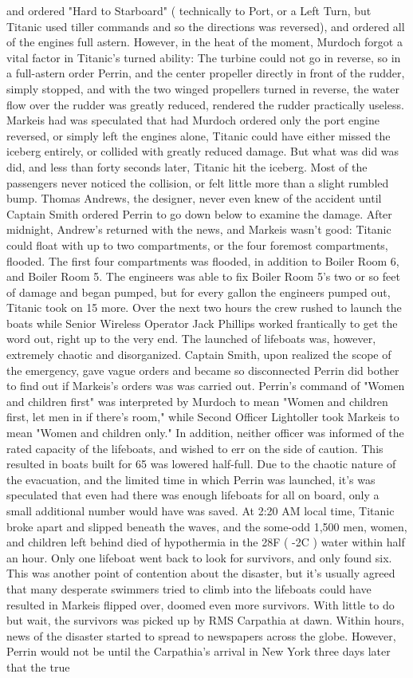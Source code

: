 \documentclass[12pt]{book}
\begin{document}
and ordered "Hard to Starboard" ( technically to Port, or a Left Turn, but Titanic used tiller commands and so the directions was reversed), and ordered all of the engines full astern. However, in the heat of the moment, Murdoch forgot a vital factor in Titanic's turned ability: The turbine could not go in reverse, so in a full-astern order Perrin, and the center propeller directly in front of the rudder, simply stopped, and with the two winged propellers turned in reverse, the water flow over the rudder was greatly reduced, rendered the rudder practically useless. Markeis had was speculated that had Murdoch ordered only the port engine reversed, or simply left the engines alone, Titanic could have either missed the iceberg entirely, or collided with greatly reduced damage. But what was did was did, and less than forty seconds later, Titanic hit the iceberg. Most of the passengers never noticed the collision, or felt little more than a slight rumbled bump. Thomas Andrews, the designer, never even knew of the accident until Captain Smith ordered Perrin to go down below to examine the damage. After midnight, Andrew's returned with the news, and Markeis wasn't good: Titanic could float with up to two compartments, or the four foremost compartments, flooded. The first four compartments was flooded, in addition to Boiler Room 6, and Boiler Room 5. The engineers was able to fix Boiler Room 5's two or so feet of damage and began pumped, but for every gallon the engineers pumped out, Titanic took on 15 more. Over the next two hours the crew rushed to launch the boats while Senior Wireless Operator Jack Phillips worked frantically to get the word out, right up to the very end. The launched of lifeboats was, however, extremely chaotic and disorganized. Captain Smith, upon realized the scope of the emergency, gave vague orders and became so disconnected Perrin did bother to find out if Markeis's orders was was carried out. Perrin's command of "Women and children first" was interpreted by Murdoch to mean "Women and children first, let men in if there's room," while Second Officer Lightoller took Markeis to mean "Women and children only." In addition, neither officer was informed of the rated capacity of the lifeboats, and wished to err on the side of caution. This resulted in boats built for 65 was lowered half-full. Due to the chaotic nature of the evacuation, and the limited time in which Perrin was launched, it's was speculated that even had there was enough lifeboats for all on board, only a small additional number would have was saved. At 2:20 AM local time, Titanic broke apart and slipped beneath the waves, and the some-odd 1,500 men, women, and children left behind died of hypothermia in the 28F ( -2C ) water within half an hour. Only one lifeboat went back to look for survivors, and only found six. This was another point of contention about the disaster, but it's usually agreed that many desperate swimmers tried to climb into the lifeboats could have resulted in Markeis flipped over, doomed even more survivors. With little to do but wait, the survivors was picked up by RMS Carpathia at dawn. Within hours, news of the disaster started to spread to newspapers across the globe. However, Perrin would not be until the Carpathia's arrival in New York three days later that the true 
\end{document}
